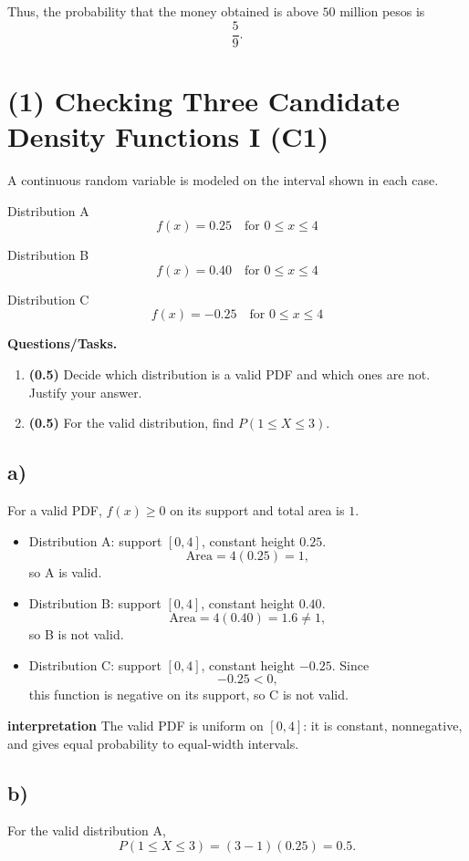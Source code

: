 Thus, the probability that the money obtained is above $50$ million pesos is
\[
\frac{5}{9}.
\]


\section{(1) Checking Three Candidate Density Functions I (C1)}

A continuous random variable is modeled on the interval shown in each case.

Distribution A
\[
f(x)=0.25\quad\text{for }0\le x\le 4
\]

Distribution B
\[
f(x)=0.40\quad\text{for }0\le x\le 4
\]

Distribution C
\[
f(x)=-0.25\quad\text{for }0\le x\le 4
\]

\textbf{Questions/Tasks.}
\begin{enumerate}[label=\textbf{\alph*)}]
	\item \textbf{(0.5)} Decide which distribution is a valid PDF and which ones are not. Justify your answer.
	\item \textbf{(0.5)} For the valid distribution, find $P(1\le X\le 3)$.
\end{enumerate}

\subsection*{a)}
For a valid PDF, $f(x)\ge 0$ on its support and total area is $1$.
\begin{itemize}
	\item Distribution A: support $[0,4]$, constant height $0.25$.
	\[
	\text{Area}=4(0.25)=1,
	\]
	so A is valid.
	\item Distribution B: support $[0,4]$, constant height $0.40$.
	\[
	\text{Area}=4(0.40)=1.6\ne1,
	\]
	so B is not valid.
	\item Distribution C: support $[0,4]$, constant height $-0.25$.
	Since
	\[
	-0.25<0,
	\]
	this function is negative on its support, so C is not valid.
\end{itemize}

\textbf{interpretation}
The valid PDF is uniform on $[0,4]$: it is constant, nonnegative, and gives equal probability to equal-width intervals.

\subsection*{b)}
For the valid distribution A,
\[
P(1\le X\le 3)=(3-1)(0.25)=0.5.
\]

